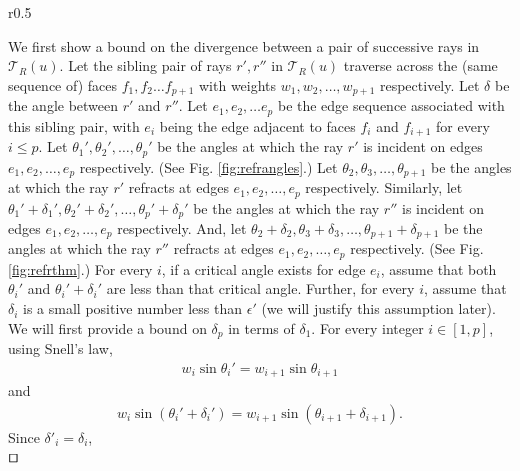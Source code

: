 \documentclass[11pt]{article}
\def\qed{\hbox{\rlap{$\sqcap$}$\sqcup$}}
\def\calT{\mathcal{T}}
\newenvironment{proof}{\par\noindent{\bf Proof:}}{\mbox{}\hfill$\qed$\\}
\begin{document}
\begin{wrapfigure}{r}{0.5\textwidth}
\centering
\begin{minipage}[b]{.4\textwidth}
\caption{\footnotesize Illustrating the angle of refractions of rays $r'$ and $r''$}
\label{fig:refrangles}
\end{minipage}
\end{wrapfigure}

\begin{proof}
We first show a  bound on the divergence between a pair of successive rays  in $\calT_R(u)$.
Let the sibling pair of rays $r', r''$ in $\calT_R(u)$ traverse across the (same sequence of) faces $f_1, f_2 \ldots f_{p+1}$ with weights $w_1, w_2, \ldots, w_{p+1}$ respectively.
Let $\delta$ be the angle between $r'$ and $r''$.
Let $e_1, e_2, \ldots e_{p}$ be the edge sequence associated with this sibling pair, with $e_i$ being the edge
adjacent to faces $f_i$ and $f_{i+1}$ for every $i \leq p$.
Let $\theta_1', \theta_2', \ldots, \theta_{p}'$ be the angles at which the ray $r'$ is incident on edges $e_1, e_2, \ldots, e_{p}$ respectively.
(See Fig. \ref{fig:refrangles}.)
Let $\theta_2, \theta_3, \ldots, \theta_{p+1}$ be the angles at which the ray $r'$ refracts at edges $e_1, e_2, \ldots, e_{p}$ respectively. 
Similarly, let $\theta_1'+\delta_1', \theta_2'+\delta_2', \ldots, \theta_{p}'+\delta_{p}'$ be the angles at which the ray $r''$ is incident on edges $e_1, e_2, \ldots, e_{p}$ respectively.
And, let $\theta_2+\delta_2, \theta_3+\delta_3, \ldots, \theta_{p+1}+\delta_{p+1}$ be the angles at which the ray $r''$ refracts at edges $e_1, e_2, \ldots, e_{p}$ respectively. 
(See Fig. \ref{fig:refrthm}.)
For every $i$, if a critical angle exists for edge $e_i$, assume that both $\theta_i'$ and $\theta_i' + \delta_i'$ are less than that critical angle.
Further, for every $i$, assume that $\delta_i$ is a small positive number less than $\epsilon'$
(we will justify this assumption later). We will first provide a bound on $\delta_p$ in terms of $\delta_1$.  \hfil\break
\hfil\break
For every integer $i \in [1, p]$, using Snell's law,
\begin{eqnarray}
w_i\sin{\theta_i'}=w_{i+1}\sin{\theta_{i+1}} \label{eq:refr}
\end{eqnarray} 
and 
\begin{eqnarray}
{w_i\sin{(\theta_i'+\delta_i')}=w_{i+1}\sin{(\theta_{i+1}+\delta_{i+1})}}.  \nonumber
\end{eqnarray} 
Since $\delta'_i=\delta_i$, \begin{eqnarray}

\end{eqnarray}
\end{proof}
\end{document}
